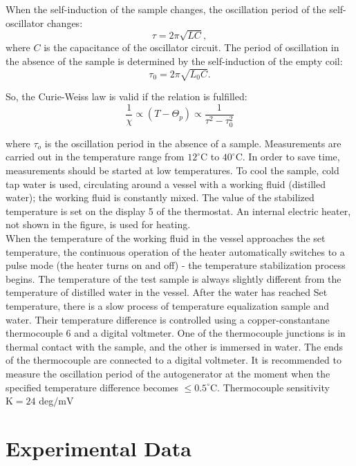 \documentclass[a4paper, 12pt]{article}%
\begin{document}
When the self-induction of the sample changes, the oscillation period of the self-oscillator changes:
\begin{equation*}
		\tau = 2\pi \sqrt{LC},
\end{equation*}
where $C$ is the capacitance of the oscillator circuit. The period of oscillation in the absence of the sample is determined by the self-induction of the empty coil:
\begin{equation*}
		\tau_0 = 2\pi \sqrt{L_0C}.
\end{equation*}

So, the Curie-Weiss law is valid if the relation is fulfilled:
\begin{equation}
		\frac{1}{\chi} \propto (T-\Theta_p) \propto \frac{1}{\tau^2-\tau_0^2}
\end{equation}

where $\tau_{o}$ is the oscillation period in the absence of a sample. Measurements are carried out in the temperature range from $12^{\circ}\mathrm{C}$ to $40^{\circ}\mathrm{C}.$ In order to save time, measurements should be started at low temperatures. To cool the sample, cold tap water is used, circulating around a vessel with a working fluid (distilled water); the working fluid is constantly mixed. The value of the stabilized temperature is set on the display 5 of the thermostat. An internal electric heater, not shown in the figure, is used for heating.\\
\newline
When the temperature of the working fluid in the vessel approaches the set temperature, the continuous operation of the heater automatically switches to a pulse mode (the heater turns on and off) - the temperature stabilization process begins. The temperature of the test sample is always slightly different from the temperature of distilled water in the vessel. After the water has reached Set temperature, there is a slow process of temperature equalization sample and water. Their temperature difference is controlled using a copper-constantane thermocouple 6 and a digital voltmeter. One of the thermocouple junctions is in thermal contact with the sample, and the other is immersed in water. The ends of the thermocouple are connected to a digital voltmeter. It is recommended to measure the oscillation period of the autogenerator at the moment when the specified temperature difference becomes $\leqslant 0.5^{\circ}\mathrm{C} .$ Thermocouple sensitivity $\mathrm{K}=24$ deg$/ \mathrm{mV}$
\section{Experimental Data}
\end{document}
